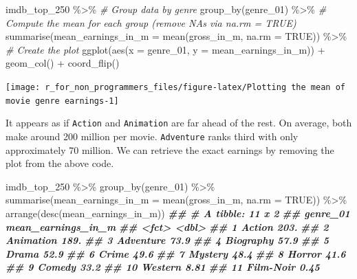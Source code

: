 \documentclass[
]{book}
\newenvironment{Shaded}{\begin{snugshade}}{\end{snugshade}}
\newcommand{\AttributeTok}[1]{\textcolor[rgb]{0.77,0.63,0.00}{#1}}
\newcommand{\CommentTok}[1]{\textcolor[rgb]{0.56,0.35,0.01}{\textit{#1}}}
\newcommand{\ConstantTok}[1]{\textcolor[rgb]{0.00,0.00,0.00}{#1}}
\newcommand{\DocumentationTok}[1]{\textcolor[rgb]{0.56,0.35,0.01}{\textbf{\textit{#1}}}}
\newcommand{\FunctionTok}[1]{\textcolor[rgb]{0.00,0.00,0.00}{#1}}
\newcommand{\NormalTok}[1]{#1}
\newcommand{\SpecialCharTok}[1]{\textcolor[rgb]{0.00,0.00,0.00}{#1}}
\begin{document}
\begin{Shaded}
\begin{Highlighting}[]
\NormalTok{imdb\_top\_250 }\SpecialCharTok{\%\textgreater{}\%}
  \CommentTok{\# Group data by genre}
  \FunctionTok{group\_by}\NormalTok{(genre\_01) }\SpecialCharTok{\%\textgreater{}\%}
  \CommentTok{\# Compute the mean for each group (remove NAs via na.rm = TRUE)}
  \FunctionTok{summarise}\NormalTok{(}\AttributeTok{mean\_earnings\_in\_m =} \FunctionTok{mean}\NormalTok{(gross\_in\_m, }\AttributeTok{na.rm =} \ConstantTok{TRUE}\NormalTok{)) }\SpecialCharTok{\%\textgreater{}\%}
\CommentTok{\# Create the plot}
  \FunctionTok{ggplot}\NormalTok{(}\FunctionTok{aes}\NormalTok{(}\AttributeTok{x =}\NormalTok{ genre\_01, }\AttributeTok{y =}\NormalTok{ mean\_earnings\_in\_m)) }\SpecialCharTok{+}
  \FunctionTok{geom\_col}\NormalTok{() }\SpecialCharTok{+}
  \FunctionTok{coord\_flip}\NormalTok{()}
\end{Highlighting}
\end{Shaded}

\begin{center}\texttt{[image: r\_for\_non\_programmers\_files/figure-latex/Plotting the mean of movie genre earnings-1]} \end{center}

It appears as if \texttt{Action} and \texttt{Animation} are far ahead of the rest. On average, both make around 200 million per movie. \texttt{Adventure} ranks third with only approximately 70 million. We can retrieve the exact earnings by removing the plot from the above code.

\begin{Shaded}
\begin{Highlighting}[]
\NormalTok{imdb\_top\_250 }\SpecialCharTok{\%\textgreater{}\%}
  \FunctionTok{group\_by}\NormalTok{(genre\_01) }\SpecialCharTok{\%\textgreater{}\%}
  \FunctionTok{summarise}\NormalTok{(}\AttributeTok{mean\_earnings\_in\_m =} \FunctionTok{mean}\NormalTok{(gross\_in\_m, }\AttributeTok{na.rm =} \ConstantTok{TRUE}\NormalTok{)) }\SpecialCharTok{\%\textgreater{}\%}
  \FunctionTok{arrange}\NormalTok{(}\FunctionTok{desc}\NormalTok{(mean\_earnings\_in\_m))}
\DocumentationTok{\#\# \# A tibble: 11 x 2}
\DocumentationTok{\#\#    genre\_01  mean\_earnings\_in\_m}
\DocumentationTok{\#\#    \textless{}fct\textgreater{}                  \textless{}dbl\textgreater{}}
\DocumentationTok{\#\#  1 Action                203.  }
\DocumentationTok{\#\#  2 Animation             189.  }
\DocumentationTok{\#\#  3 Adventure              73.9 }
\DocumentationTok{\#\#  4 Biography              57.9 }
\DocumentationTok{\#\#  5 Drama                  52.9 }
\DocumentationTok{\#\#  6 Crime                  49.6 }
\DocumentationTok{\#\#  7 Mystery                48.4 }
\DocumentationTok{\#\#  8 Horror                 41.6 }
\DocumentationTok{\#\#  9 Comedy                 33.2 }
\DocumentationTok{\#\# 10 Western                 8.81}
\DocumentationTok{\#\# 11 Film{-}Noir               0.45}
\end{Highlighting}
\end{Shaded}
\end{document}
